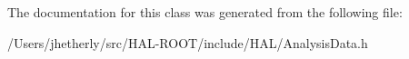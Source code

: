 The documentation for this class was generated from the following file\+:\begin{DoxyCompactItemize}
\item 
/\+Users/jhetherly/src/\+H\+A\+L-\/\+R\+O\+O\+T/include/\+H\+A\+L/Analysis\+Data.\+h\end{DoxyCompactItemize}
